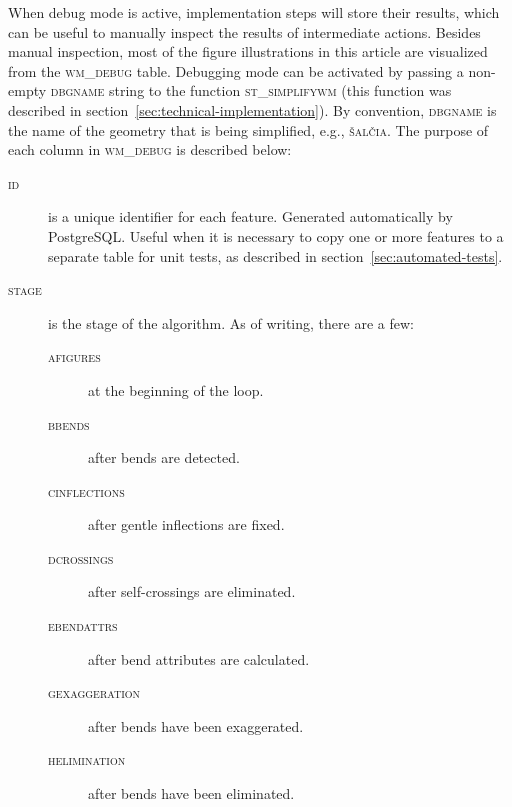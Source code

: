 \documentclass[a4paper]{article}
\begin{document}
When debug mode is active, implementation steps will store their results, which
can be useful to manually inspect the results of intermediate actions. Besides
manual inspection, most of the figure illustrations in this article are
visualized from the \textsc{wm\_debug} table. Debugging mode can be activated
by passing a non-empty \textsc{dbgname} string to the function
\textsc{st\_simplifywm} (this function was described in
section~\ref{sec:technical-implementation}). By convention, \textsc{dbgname} is
the name of the geometry that is being simplified, e.g., \textsc{šalčia}. The
purpose of each column in \textsc{wm\_debug} is described below:

\begin{description}

    \item[\normalfont\textsc{id}] is a unique identifier for each feature.
        Generated automatically by PostgreSQL. Useful when it is necessary to
        copy one or more features to a separate table for unit tests, as
        described in section~\ref{sec:automated-tests}.

    \item[\normalfont\textsc{stage}] is the stage of the algorithm. As of
        writing, there are a few:
        \begin{description}
            \item[\normalfont\textsc{afigures}] at the beginning of the loop.
            \item[\normalfont\textsc{bbends}] after bends are detected.

            \item[\normalfont\textsc{cinflections}] after gentle inflections
                are fixed.

            \item[\normalfont\textsc{dcrossings}] after self-crossings are
                eliminated.

            \item[\normalfont\textsc{ebendattrs}] after bend attributes are
                calculated.

            \item[\normalfont\textsc{gexaggeration}] after bends have been
                exaggerated.

            \item[\normalfont\textsc{helimination}] after bends have been
                eliminated.

        \end{description}


\end{description}
\end{document}
